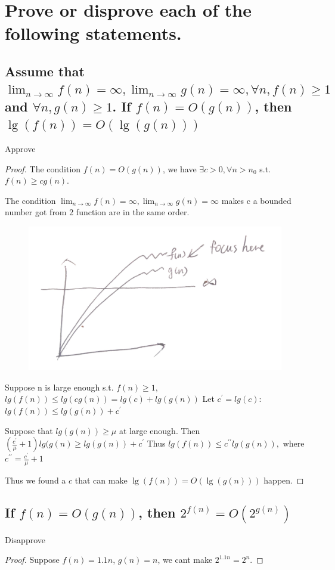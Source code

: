 \documentclass[a4paper]{article}
\begin{document}
\section{Prove or disprove each of the following statements.} 
\subsection{Assume that $\lim _{n \rightarrow \infty} f(n)=\infty, \lim _{n \rightarrow \infty} g(n)=\infty, \forall n, f(n) \geq 1$ and $\forall n, g(n) \geq 1$. If $f(n)=O(g(n))$, then $\lg (f(n))=O(\lg (g(n)))$}\label{prove}
Approve
\begin{proof}
The condition $ f(n)=O(g(n))$, we have $\exists c>0, \forall n>n_0$ s.t. $f(n)\geq cg(n)$.

The condition $\lim _{n \rightarrow \infty} f(n)=\infty, \lim _{n \rightarrow \infty} g(n)=\infty$ makes c a bounded number got from 2 function are in the same order. 

\begin{figure}[h]
  \centering
  \includegraphics[width=0.4\linewidth]{./hw01-03-01.jpg}
\end{figure}

Suppose n is large enough s.t. $f(n)\geq 1$, $lg(f(n)) \leq lg(c g(n)) = lg(c) + lg(g(n))$
Let $c^{\prime}=lg(c)$: $lg(f(n)) \leq lg(g(n)) +c^{\prime}$

Suppose that $lg(g(n)) \geq \mu$ at large enough.
Then $(\frac{c^{\prime}}{\mu}+1)lg(g(n) \geq lg(g(n)) + c^{\prime}$
Thus $lg(f(n)) \leq c^{\prime\prime} lg(g(n)),$ where $c^{\prime\prime} = \frac{c^{\prime}}{\mu}+1$ 

Thus we found a $c$ that can make $\lg (f(n))=O(\lg (g(n)))$ happen.
\end{proof}
\subsection{ If $ f(n)=O(g(n)) $, then $2^{ f(n)}=O\left(2^ {g(n)}\right)$}
Disapprove
\begin{proof}
Suppose $f(n)=1.1n$, $g(n)=n$, we cant make $2^{1.1n}= 2^n$.
\end{proof}
\end{document}
